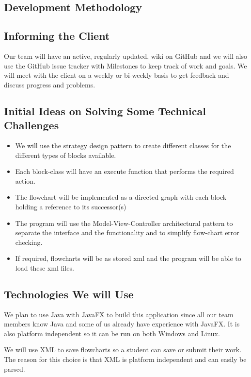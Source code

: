
\subsection{Development Methodology}


\subsection{Informing the Client}
Our team will have an active, regularly updated, wiki on GitHub and we will also use the GitHub issue tracker with Milestones to keep track of work and goals. We will meet with the client on a weekly or bi-weekly basis to get feedback and discuss progress and problems.

\subsection{Initial Ideas on Solving Some Technical Challenges}
\begin{itemize}
	\item We will use the strategy design pattern to create different classes for the different types of blocks available.
	\item Each block-class will have an execute function that performs the required action.
	\item The flowchart will be implemented as a directed graph with each block holding a reference to its successor(s)
	\item The program will use the Model-View-Controller architectural pattern to separate the interface and the functionality and to simplify flow-chart error checking.
	\item If required, flowcharts will be as stored xml and the program will be able to load these xml files.
\end{itemize}

\subsection{Technologies We will Use}
We plan to use Java with JavaFX to build this application since all our team members know Java and some of us already have experience with JavaFX. It is also platform independent so it can be run on both Windows and Linux.

We will use XML to save flowcharts so a student can save or submit their work. The reason for this choice is that XML is platform independent and can easily be parsed. 

